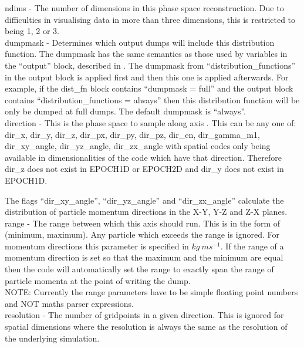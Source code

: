 {\emphtext ndims} - The number of dimensions in this phase space
reconstruction. Due to difficulties in visualising data in more than three
dimensions, this is restricted to being 1, 2 or 3.\\

{\emphtext dumpmask} - Determines which output dumps will include this
distribution function. The dumpmask has the same semantics as those used
by variables in the ``output'' block, described in .
The dumpmask from ``distribution\_functions'' in the output block is applied
first and then this one is applied afterwards. For example, if the
dist\_fn block contains ``dumpmask = full'' and the output block contains
``distribution\_functions = always'' then this distribution function will be
only be dumped at full dumps. The default dumpmask is ``always''.\\

{\emphtext direction} - This is the phase space to sample
along axis . This can be any one of:
dir\_x, dir\_y, dir\_z, dir\_px, dir\_py, dir\_pz, dir\_en, dir\_gamma\_m1,
dir\_xy\_angle, dir\_yz\_angle, dir\_zx\_angle
with spatial codes only being available in dimensionalities of the code which
have that direction. Therefore dir\_z does not exist in EPOCH1D or EPOCH2D
and dir\_y does not exist in EPOCH1D.

The flags ``dir\_xy\_angle'', ``dir\_yz\_angle'' and
``dir\_zx\_angle'' calculate the distribution
of particle momentum directions in the X-Y, Y-Z and Z-X planes.\\

{\emphtext range} - The range between which this axis should
run. This is in the form of (minimum, maximum). Any particle which exceeds
the range is ignored.
For momentum directions this parameter is specified in
$kg\ ms^{-1}$. If the range of a momentum direction is set so that the maximum
and the minimum are equal then the code will automatically set the range to
exactly span the range of particle momenta at the point of writing the dump.\\

{\emphtext NOTE: Currently the range parameters have to be simple floating
point numbers and NOT maths parser expressions.}\\

{\emphtext resolution} - The number of gridpoints in a given
direction. This is ignored for spatial dimensions where the
resolution is always the same as the resolution of the underlying simulation.\\

